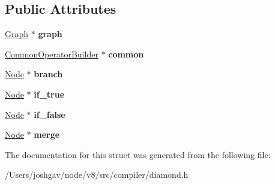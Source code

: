 \subsection*{Public Attributes}
\begin{DoxyCompactItemize}
\item 
\hyperlink{classv8_1_1internal_1_1compiler_1_1_graph}{Graph} $\ast$ {\bfseries graph}\hypertarget{structv8_1_1internal_1_1compiler_1_1_diamond_ac8b3bd2954f40f5a0761c8c2b2cd110c}{}\label{structv8_1_1internal_1_1compiler_1_1_diamond_ac8b3bd2954f40f5a0761c8c2b2cd110c}

\item 
\hyperlink{classv8_1_1internal_1_1compiler_1_1_common_operator_builder}{Common\+Operator\+Builder} $\ast$ {\bfseries common}\hypertarget{structv8_1_1internal_1_1compiler_1_1_diamond_a46deb93e28010edaec798151fa131570}{}\label{structv8_1_1internal_1_1compiler_1_1_diamond_a46deb93e28010edaec798151fa131570}

\item 
\hyperlink{classv8_1_1internal_1_1compiler_1_1_node}{Node} $\ast$ {\bfseries branch}\hypertarget{structv8_1_1internal_1_1compiler_1_1_diamond_ad42656961060c0d06b2677c8811d8e12}{}\label{structv8_1_1internal_1_1compiler_1_1_diamond_ad42656961060c0d06b2677c8811d8e12}

\item 
\hyperlink{classv8_1_1internal_1_1compiler_1_1_node}{Node} $\ast$ {\bfseries if\+\_\+true}\hypertarget{structv8_1_1internal_1_1compiler_1_1_diamond_add8bfb94c530077049748b13fb8d7406}{}\label{structv8_1_1internal_1_1compiler_1_1_diamond_add8bfb94c530077049748b13fb8d7406}

\item 
\hyperlink{classv8_1_1internal_1_1compiler_1_1_node}{Node} $\ast$ {\bfseries if\+\_\+false}\hypertarget{structv8_1_1internal_1_1compiler_1_1_diamond_acac362285997b904a29d2da366d61f8a}{}\label{structv8_1_1internal_1_1compiler_1_1_diamond_acac362285997b904a29d2da366d61f8a}

\item 
\hyperlink{classv8_1_1internal_1_1compiler_1_1_node}{Node} $\ast$ {\bfseries merge}\hypertarget{structv8_1_1internal_1_1compiler_1_1_diamond_ab234093a7223e62ad377ddc285178d30}{}\label{structv8_1_1internal_1_1compiler_1_1_diamond_ab234093a7223e62ad377ddc285178d30}

\end{DoxyCompactItemize}


The documentation for this struct was generated from the following file\+:\begin{DoxyCompactItemize}
\item 
/\+Users/joshgav/node/v8/src/compiler/diamond.\+h\end{DoxyCompactItemize}
